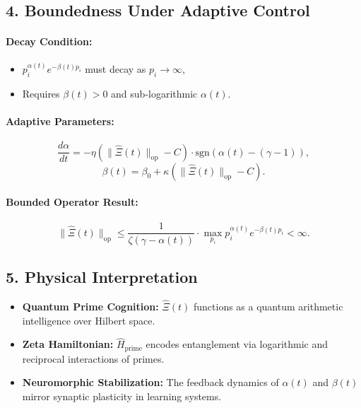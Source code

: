 \documentclass[12pt]{article}
\theoremstyle{plain}
\begin{document}
\subsection*{4. Boundedness Under Adaptive Control}

\paragraph*{Decay Condition:}
\begin{itemize}
    \item \( p_i^{\alpha(t)} e^{-\beta(t) p_i} \) must decay as \( p_i \to \infty \),
    \item Requires \( \beta(t) > 0 \) and sub-logarithmic \( \alpha(t) \).
\end{itemize}

\paragraph*{Adaptive Parameters:}
\[
\frac{d\alpha}{dt} = -\eta \left( \| \hat{\Xi}(t) \|_{\text{op}} - C \right) \cdot \text{sgn}(\alpha(t) - (\gamma - 1)),
\]
\[
\beta(t) = \beta_0 + \kappa \left( \| \hat{\Xi}(t) \|_{\text{op}} - C \right).
\]

\paragraph*{Bounded Operator Result:}
\[
\| \hat{\Xi}(t) \|_{\text{op}} \leq \frac{1}{\zeta(\gamma - \alpha(t))} \cdot \max_{p_i} p_i^{\alpha(t)} e^{-\beta(t) p_i} < \infty.
\]

\subsection*{5. Physical Interpretation}

\begin{itemize}
    \item \textbf{Quantum Prime Cognition:}  
    \( \hat{\Xi}(t) \) functions as a quantum arithmetic intelligence over Hilbert space.
    
    \item \textbf{Zeta Hamiltonian:}  
    \( \hat{H}_{\text{prime}} \) encodes entanglement via logarithmic and reciprocal interactions of primes.

    \item \textbf{Neuromorphic Stabilization:}  
    The feedback dynamics of \( \alpha(t) \) and \( \beta(t) \) mirror synaptic plasticity in learning systems.
\end{itemize}
\end{document}
